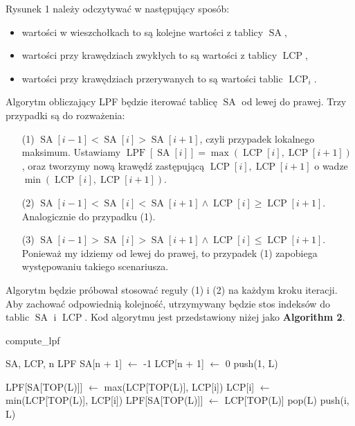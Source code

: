 \documentclass[a4paper,12pt]{article}
\theoremstyle{definition}
\DeclareMathOperator{\SA}{SA}
\DeclareMathOperator{\LCP}{LCP}
\DeclareMathOperator{\LPF}{LPF}
\begin{document}
\pagebreak

Rysunek 1 należy odczytywać w następujący sposób:
\begin{itemize}
\item wartości w wieszchołkach to są kolejne wartości z tablicy $\SA$,
\item wartości przy krawędziach zwykłych to są wartości z tablicy $\LCP$,
\item wartości przy krawędziach przerywanych to są wartości tablic $\LCP_{i}$.
\end{itemize}

Algorytm obliczający LPF będzie iterować tablicę $\SA$ od lewej do prawej.
Trzy przypadki są do rozważenia:

\begin{enumerate}
\item[(1)] $\SA[i - 1] < \SA[i] > \SA[i + 1]$, czyli przypadek lokalnego maksimum.
  Ustawiamy $\LPF[\SA[i]] = \max(\LCP[i], \LCP[i + 1])$, oraz
  tworzymy nową krawędź zastępującą $\LCP[i], \LCP[i + 1]$ o wadze $\min(\LCP[i], \LCP[i + 1])$.
\item[(2)] $\SA[i - 1] < \SA[i] < \SA[i + 1] \land \LCP[i] \geq \LCP[i + 1]$.
  Analogicznie do przypadku (1).
\item[(3)] $\SA[i - 1] > \SA[i] > \SA[i + 1] \land \LCP[i] \leq \LCP[i + 1]$.
  Ponieważ my idziemy od lewej do prawej, to przypadek (1) zapobiega występowaniu takiego scenariusza.
\end{enumerate}

Algorytm będzie próbował stosować reguły (1) i (2) na każdym kroku iteracji.
Aby zachować odpowiednią kolejność, utrzymywany będzie stos indeksów do tablic $\SA$ i $\LCP$.
Kod algorytmu jest przedstawiony niżej jako \textbf{Algorithm 2}.

\begin{algorithm}
\caption{compute\_lpf}
\begin{algorithmic}
\REQUIRE SA, LCP, n
\ENSURE LPF
\STATE SA[n + 1] $\gets$ -1
\STATE LCP[n + 1] $\gets$ 0
\STATE push(1, L)

\STATE LPF[SA[TOP(L)]] $\gets$ max(LCP[TOP(L)], LCP[i])
\STATE LCP[i] $\gets$ min(LCP[TOP(L)], LCP[i])
\ELSE
\STATE LPF[SA[TOP(L)]] $\gets$ LCP[TOP(L)]
\ENDIF
\STATE pop(L)
\ENDWHILE
{}
\STATE push(i, L)
\ENDIF
\ENDFOR
\end{algorithmic}
\end{algorithm}
\end{document}
